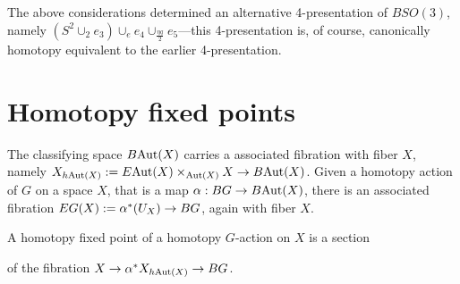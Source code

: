 \documentclass{amsart}
\begin{document}


\begin{remark}
The above considerations determined an alternative 4-presentation of $BSO(3)$, namely $(S^2 \cup_2 e_3) \cup_{e} e_4 \cup_{\frac{\eta q}{2}} e_5$---this 4-presentation is, of course, canonically homotopy equivalent to the earlier 4-presentation.  %
\end{remark}

\section{Homotopy fixed points}


The classifying space $B\mathrm{Aut}(X)$ carries a associated fibration with fiber $X$, namely $X_{h\mathrm{Aut}(X)} := E\mathrm{Aut}(X) \times_{\mathrm{Aut}(X)} X \rightarrow B\mathrm{Aut}(X)$.    Given a homotopy action of $G$ on a space $X$, that is a map $\alpha: BG \rightarrow B\mathrm{Aut}(X)$, there is an associated fibration $EG(X):=\alpha^\ast(U_X) \rightarrow BG$, again with fiber $X$.

\begin{definition}
A homotopy fixed point of a homotopy $G$-action on $X$ is a section
\begin{center}
\end{center}
of the fibration $X \rightarrow \alpha^*X_{h\mathrm{Aut}(X)} \rightarrow BG$.
\end{definition}
\end{document}

